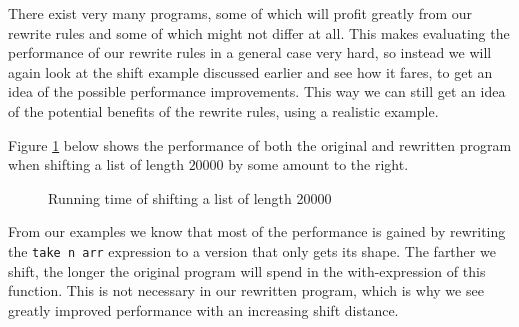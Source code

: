 \documentclass[../main.tex]{subfiles}
\begin{document}
There exist very many programs, some of which will profit greatly from our rewrite rules and some of which might not differ at all. This makes evaluating the performance of our rewrite rules in a general case very hard, so instead we will again look at the shift example discussed earlier and see how it fares, to get an idea of the possible performance improvements. This way we can still get an idea of the potential benefits of the rewrite rules, using a realistic example.

Figure \ref{fig:performance} below shows the performance of both the original and rewritten program when shifting a list of length $20000$ by some amount to the right.
\begin{figure}[!h]
    \centering
    \caption{Running time of shifting a list of length 20000}
    \pgfplotsset{scaled x ticks=false}
    \label{fig:performance}
\end{figure}

From our examples we know that most of the performance is gained by rewriting the \texttt{take n arr} expression to a version that only gets its shape. The farther we shift, the longer the original program will spend in the with-expression of this function. This is not necessary in our rewritten program, which is why we see greatly improved performance with an increasing shift distance.
\end{document}
